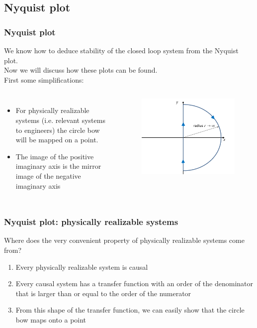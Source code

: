 \subsection{Nyquist plot}

\begin{frame}
	\frametitle{Nyquist plot}
	We know how to deduce stability of the closed loop system from the Nyquist plot.\\
	Now we will discuss how these plots can be found.\\
	\smallskip
	First some simplifications:
	\vspace{-1ex}
	\begin{columns}
		\begin{itemize}
			\item For physically realizable systems (i.e. relevant systems to engineers) the circle bow will be mapped on a point.
			\item The image of the positive imaginary axis is the mirror image of the negative imaginary axis
		\end{itemize}
		\vspace{-2ex}
		\begin{figure}
			\includegraphics[width=1\linewidth]{nyquist_plot}
		\end{figure}
	\end{columns}
\end{frame}

\begin{frame}
	\frametitle{Nyquist plot: physically realizable systems}
	\vspace{-8ex}
	Where does the very convenient property of physically realizable systems come from?
	\begin{enumerate}
		\item Every physically realizable system is causal
		\item Every causal system has a transfer function with an order of the denominator that is larger than or equal to the order of the numerator
		\item From this shape of the transfer function, we can easily show that the circle bow maps onto a point
	\end{enumerate}
\end{frame}


